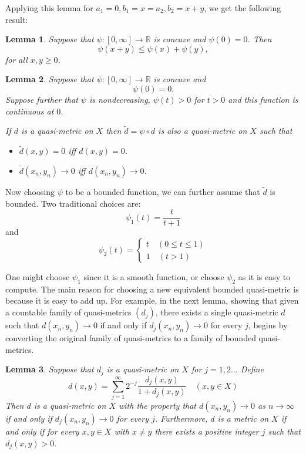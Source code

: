 \documentclass{article} %
\newtheorem{lemma}{Lemma}
\begin{document}
Applying this lemma for $a_1 =0, b_1=x = a_2, b_2=x+y$, we get the following result:
\begin{lemma}
  Suppose that $\psi \colon [0,\infty] \to \mathbb{R}$ is concave and $\psi(0)=0$. Then
  \[ \psi(x+y) \le \psi(x) + \psi(y),\]
  for all $x,y \ge 0$.
\end{lemma}
\begin{lemma}
  Suppose that $\psi \colon [0,\infty] \to \mathbb{R}$ is concave and
  \[\psi(0)=0.\]
  Suppose further that $\psi$ is nondecreasing, $\psi(t) >0$ for $t >0$ and this function is continuous at $0$.

  If $d$ is a quasi-metric on $X$ then $\tilde{d} = \psi \circ d$ is also a quasi-metric on $X$
  such that
  \begin{itemize}
    \item $\tilde{d}(x,y)=0$ iff $d(x,y)=0$.
    \item $\tilde{d}(x_n,y_n) \to 0$ iff $d(x_n,y_n) \to 0$.
  \end{itemize}
\end{lemma}
Now choosing $\psi$ to be a bounded function, we can further assume that $\tilde{d}$ is bounded. Two traditional choices are:
\[ \psi_1(t)= \dfrac{t}{t+1}\]
and
\[\psi_2(t) = \begin{cases}
    t \quad (0 \le t \le 1) \\
    1 \quad (t >1)
  \end{cases}\]

One might choose $\psi_1$ since it is a smooth function, or choose $\psi_2$ as it is easy to compute.
The main reason for choosing a new equivalent bounded quasi-metric is because it is easy to add up.
For example, in the next lemma, showing that given a countable family of quasi-metrics $(d_j)$, there exists a single quasi-metric $d$
such that $d(x_n,y_n) \to 0$  if and only if $d_j(x_n,y_n) \to 0$ for every $j$, begins by converting the original family of quasi-metrics to a family of bounded quasi-metrics.

\begin{lemma}
  Suppose that $d_j$ is a quasi-metric on $X$ for $j =1,2\ldots$ Define
  \[d(x,y) = \sum_{j=1}^\infty 2^{-j}\dfrac{d_j(x,y)}{1+d_j(x,y)} \quad (x,y \in X)\]
  Then $d$ is a quasi-metric on $X$ with the property that $d(x_n,y_n) \to 0$ as $n \to \infty$
  if and only if $d_j(x_n,y_n) \to 0$ for every $j$.
  Furthermore, $d$ is a metric on $X$ if and only if for every $x,y \in X$ with $x \ne y$ there exists a positive integer $j$ such that $d_j(x,y)>0$.
\end{lemma}
\end{document}
